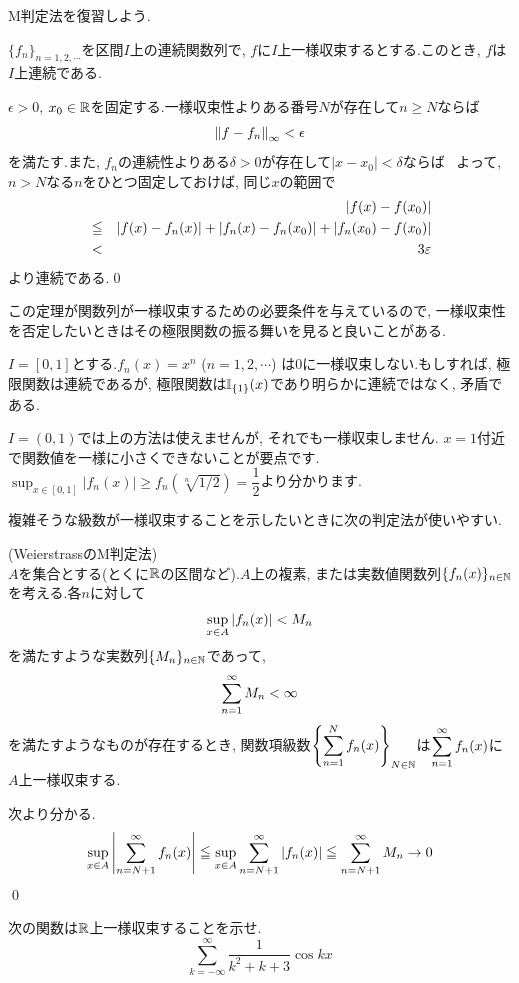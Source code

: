M判定法を復習しよう.
\begin{theo}
$\{ f_n \}_{n=1,2,\cdots}$を区間$I$上の連続関数列で, $f$に$I$上一様収束するとする.このとき, $f$は$I$上連続である.
\end{theo}
\prf $\epsilon >0$, $x_0 \in \mathbb{R}$を固定する.一様収束性よりある番号$N$が存在して$n\geq N$ならば
\[\left\| f- f_n \right\|_{\infty} < \epsilon\]
を満たす.また, $f_n$の連続性よりある$\delta > 0$が存在して$|x-x_0| < \delta$ならば
\
よって, $n>N$なる$n$をひとつ固定しておけば, 同じ$x$の範囲で
\begin{eqnarray*}
&&\left| f(x) - f(x_0) \right|\\
&\leqq&\left| f(x) - f_n(x) \right| + \left| f_n(x) - f_n(x_0) \right| + \left| f_n(x_0) - f(x_0) \right|\\
& < & 3\varepsilon
\end{eqnarray*}
より連続である.\qed\par
この定理が関数列が一様収束するための必要条件を与えているので, 一様収束性を否定したいときはその極限関数の振る舞いを見ると良いことがある.
\begin{eg}
$I=[0,1]$とする.$f_n(x) = x^{n}$ ($n=1,2,\cdots$) は$0$に一様収束しない.もしすれば, 極限関数は連続であるが, 極限関数は$\mathbb{I}_{\{ 1 \}}(x)$であり明らかに連続ではなく, 矛盾である.

$I=(0,1)$では上の方法は使えませんが, それでも一様収束しません. $x=1$付近で関数値を一様に小さくできないことが要点です. $\sup_{x\in [0,1]} |f_n(x)| \geq f_n(\sqrt[n]{1/2}) = \dfrac{1}{2}$より分かります.
\end{eg}
複雑そうな級数が一様収束することを示したいときに次の判定法が使いやすい.
\besha
\begin{theo} (WeierstrassのM判定法)\\
$A$を集合とする(とくに$\mathbb{R}$の区間など).$A$上の複素, または実数値関数列$\{ f_n(x)\}_{n\in \mathbb{N}}$を考える.各$n$に対して
\[\displaystyle\sup_{x\in A}|f_n(x)| < M_n\]
を満たすような実数列$\{ M_n\}_{n\in \mathbb{N}}$であって,
\[\displaystyle\sum_{n=1}^{\infty} M_n < \infty\]
を満たすようなものが存在するとき, 関数項級数$\left\{ \displaystyle\sum_{n=1}^{N} f_n(x)  \right\}_{N\in \mathbb{N}}$は$\displaystyle\sum_{n=1}^{\infty} f_n(x)$に$A$上一様収束する.
\end{theo}
\ensha
\prf 次より分かる.
\[\sup_{x\in A} \left|  \sum_{n=N+1}^{\infty}f_n(x)  \right| \leqq \sup_{x\in A} \sum_{n=N+1}^{\infty}\left| f_n(x) \right| \leqq \sum_{n=N+1}^{\infty} M_n \to 0 \]
\qed


\begin{prac}
次の関数は$\mathbb{R}$上一様収束することを示せ.
\[\sum_{k=-\infty}^{\infty} \dfrac{1}{k^2+k+3}\cos{kx}\]
\end{prac}

